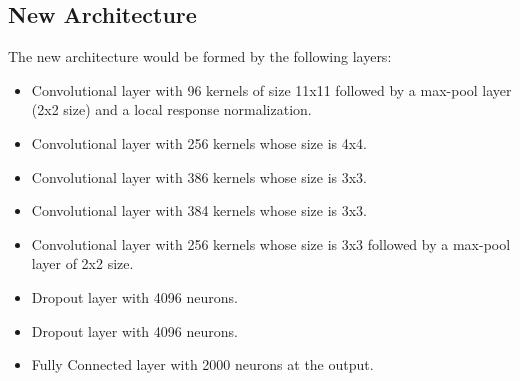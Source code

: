 
\subsection{New Architecture} \label{subsec:ejecucion1}
The new architecture would be formed by the following layers:
\begin{itemize}[noitemsep,topsep=8pt,parsep=0pt,partopsep=20pt]
\item Convolutional layer with 96 kernels of size 11x11 followed by a max-pool layer (2x2 size) and a local response normalization.
\item Convolutional layer with 256 kernels whose size is 4x4.
\item Convolutional layer with 386 kernels whose size is 3x3.
\item Convolutional layer with 384 kernels whose size is 3x3.
\item Convolutional layer with 256 kernels whose size is 3x3 followed by a max-pool layer of 2x2 size.
\item Dropout layer with 4096 neurons.
\item Dropout layer with 4096 neurons.
\item Fully Connected layer with 2000 neurons at the output.
\end{itemize}


